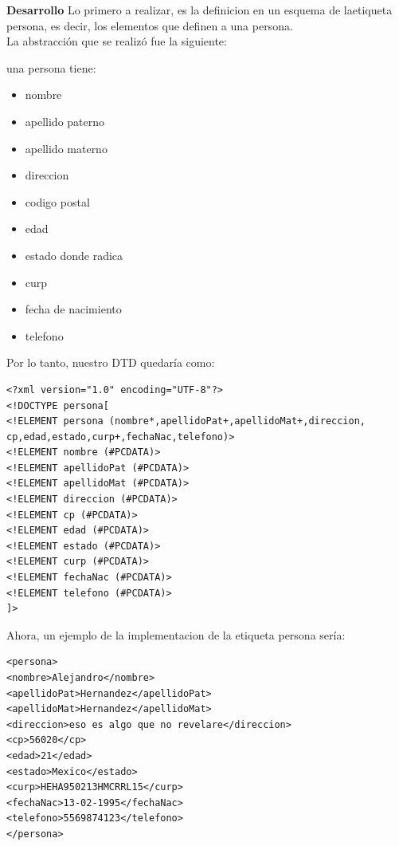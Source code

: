 \documentclass[12pt,letterpaper]{article}
\begin{document}
\newpage
{\Huge {\rm {\bf Desarrollo}}}
Lo primero a realizar, es la definicion en un esquema de laetiqueta persona, es decir, los elementos que definen a una persona.
\\La abstracci\'on que se realiz\'o fue la siguiente: 
\begin{center}
\fboxsep 12pt
\begin{minipage}[t]{6cm}
{ una persona tiene:
\begin{itemize}
\item nombre
\item apellido paterno
\item apellido materno
\item direccion
\item codigo postal
\item edad
\item estado donde radica
\item curp
\item fecha de nacimiento
\item telefono
\end{itemize}
}
\end{minipage}
\end{center}
Por lo tanto, nuestro DTD quedar\'ia como: \\
\vspace{1cm}
\begin{minipage}[t]{8cm}
{
\begin{verbatim}
<?xml version="1.0" encoding="UTF-8"?>
<!DOCTYPE persona[
<!ELEMENT persona (nombre*,apellidoPat+,apellidoMat+,direccion,
cp,edad,estado,curp+,fechaNac,telefono)>
<!ELEMENT nombre (#PCDATA)>
<!ELEMENT apellidoPat (#PCDATA)>
<!ELEMENT apellidoMat (#PCDATA)>
<!ELEMENT direccion (#PCDATA)>
<!ELEMENT cp (#PCDATA)>
<!ELEMENT edad (#PCDATA)>
<!ELEMENT estado (#PCDATA)>
<!ELEMENT curp (#PCDATA)>
<!ELEMENT fechaNac (#PCDATA)>
<!ELEMENT telefono (#PCDATA)>
]>
\end{verbatim}

}
\end{minipage}

Ahora, un ejemplo de la implementacion de la etiqueta persona ser\'ia:
\begin{minipage}[t]{8cm}{
\vspace{2mm}
\begin{verbatim}
<persona>
<nombre>Alejandro</nombre>
<apellidoPat>Hernandez</apellidoPat>
<apellidoMat>Hernandez</apellidoMat>
<direccion>eso es algo que no revelare</direccion>
<cp>56020</cp>
<edad>21</edad>
<estado>Mexico</estado>
<curp>HEHA950213HMCRRL15</curp>
<fechaNac>13-02-1995</fechaNac>
<telefono>5569874123</telefono>
</persona>
\end{verbatim}
}
\end{minipage}
\\
\end{document}
